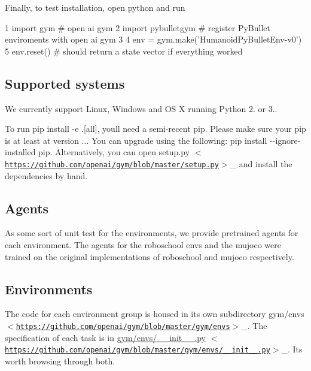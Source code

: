 Finally, to test installation, open python and run 
\begin{DoxyCode}
1 import gym  # open ai gym
2 import pybulletgym  # register PyBullet enviroments with open ai gym
3 
4 env = gym.make('HumanoidPyBulletEnv-v0')
5 env.reset()  # should return a state vector if everything worked
\end{DoxyCode}


\subsection*{Supported systems}

We currently support Linux, Windows and OS X running Python 2. or 3..

To run {\ttfamily pip install -\/e \textquotesingle{}.\mbox{[}all\mbox{]}\textquotesingle{}}, you\textquotesingle{}ll need a semi-\/recent pip. Please make sure your pip is at least at version {..}. You can upgrade using the following\+: {\ttfamily pip install -\/-\/ignore-\/installed pip}. Alternatively, you can open {\ttfamily setup.\+py $<$\href{https://github.com/openai/gym/blob/master/setup.py}{\tt https\+://github.\+com/openai/gym/blob/master/setup.\+py}$>$}\+\_\+ and install the dependencies by hand.

\subsection*{Agents}

As some sort of unit test for the environments, we provide pretrained agents for each environment. The agents for the roboschool envs and the mujoco were trained on the original implementations of roboschool and mujoco respectively.

\subsection*{Environments}

The code for each environment group is housed in its own subdirectory {\ttfamily gym/envs $<$\href{https://github.com/openai/gym/blob/master/gym/envs}{\tt https\+://github.\+com/openai/gym/blob/master/gym/envs}$>$}\+\_\+. The specification of each task is in {\ttfamily \hyperlink{external_2pybullet-gym_2pybulletgym_2envs_2____init_____8py}{gym/envs/\+\_\+\+\_\+init\+\_\+\+\_\+.\+py} $<$\href{https://github.com/openai/gym/blob/master/gym/envs/__init__.py}{\tt https\+://github.\+com/openai/gym/blob/master/gym/envs/\+\_\+\+\_\+init\+\_\+\+\_\+.\+py}$>$}\+\_\+. It\textquotesingle{}s worth browsing through both.

